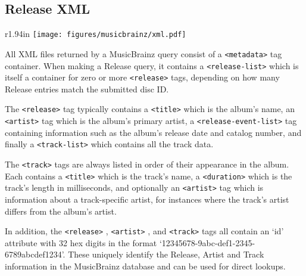 \subsection{Release XML}
\begin{wrapfigure}[21]{r}{1.94in}
\texttt{[image: figures/musicbrainz/xml.pdf]}
\end{wrapfigure}
All XML files returned by a MusicBrainz query consist of a
\texttt{<metadata>}
tag container.
When making a Release query, it contains a
\texttt{<release-list>}
which is itself a container for zero or more
\texttt{<release>}
tags, depending on how many Release entries match the submitted
disc ID.

The
\texttt{<release>}
tag typically contains a
\texttt{<title>}
which is the album's name,
an
\texttt{<artist>}
tag which is the album's primary artist,
a
\texttt{<release-event-list>}
tag containing information such as the album's
release date and catalog number,
and finally a
\texttt{<track-list>}
which contains all the track data.

The
\texttt{<track>}
tags are always listed in order of their appearance in the album.
Each contains a
\texttt{<title>}
which is the track's name,
a
\texttt{<duration>}
which is the track's length in milliseconds,
and optionally an
\texttt{<artist>}
tag which is information about a track-specific artist,
for instances where the track's artist differs from the album's artist.

In addition, the
\texttt{<release>}
,
\texttt{<artist>}
,
and
\texttt{<track>}
tags all contain an `id' attribute with 32 hex digits in the format
`12345678-9abc-def1-2345-6789abcdef1234'.
These uniquely identify the Release, Artist and Track information
in the MusicBrainz database and can be used for direct lookups.
